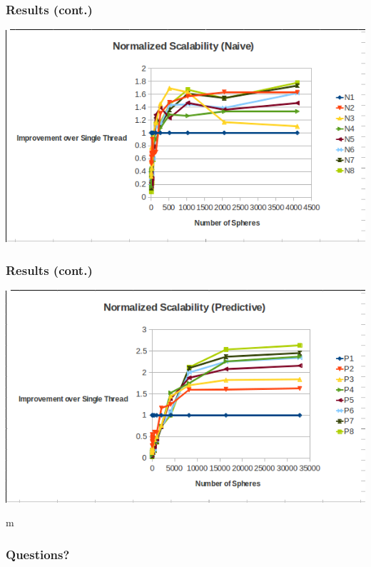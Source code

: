 \documentclass{beamer}
\begin{document}
\begin{frame}
	\frametitle{Results (cont.)}
	\begin{center}
		\includegraphics[width=.75\textwidth]{normalized_scalability_naive.png}
	\end{center}
\end{frame}

\begin{frame}
	\frametitle{Results (cont.)}
	\begin{center}
		\includegraphics[width=.75\textwidth]{normalized_scalability_predictive.png}
	\end{center}
\end{frame}m


\begin{frame}
  \frametitle{Questions?}
\end{frame}



	
\end{document}

